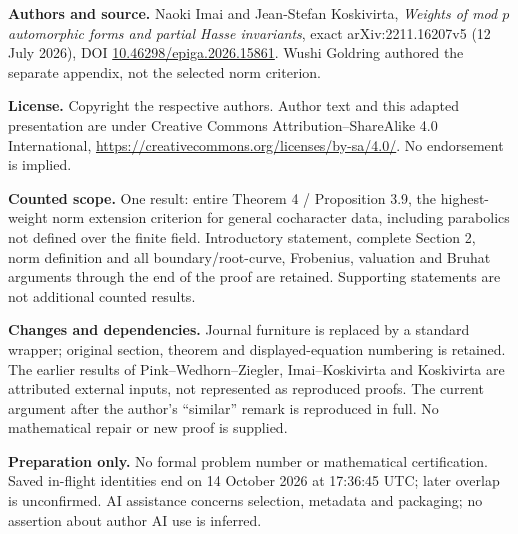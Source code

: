 \noindent\textbf{Authors and source.} Naoki Imai and Jean-Stefan Koskivirta, \emph{Weights of mod $p$ automorphic forms and partial Hasse invariants}, exact arXiv:2211.16207v5 (12 July 2026), DOI \href{https://doi.org/10.46298/epiga.2026.15861}{10.46298/epiga.2026.15861}. Wushi Goldring authored the separate appendix, not the selected norm criterion.
\par\noindent\textbf{License.} Copyright the respective authors. Author text and this adapted presentation are under Creative Commons Attribution--ShareAlike 4.0 International, \url{https://creativecommons.org/licenses/by-sa/4.0/}. No endorsement is implied.
\par\noindent\textbf{Counted scope.} One result: entire Theorem 4 / Proposition 3.9, the highest-weight norm extension criterion for general cocharacter data, including parabolics not defined over the finite field. Introductory statement, complete Section 2, norm definition and all boundary/root-curve, Frobenius, valuation and Bruhat arguments through the end of the proof are retained. Supporting statements are not additional counted results.
\par\noindent\textbf{Changes and dependencies.} Journal furniture is replaced by a standard wrapper; original section, theorem and displayed-equation numbering is retained. The earlier results of Pink--Wedhorn--Ziegler, Imai--Koskivirta and Koskivirta are attributed external inputs, not represented as reproduced proofs. The current argument after the author's ``similar'' remark is reproduced in full. No mathematical repair or new proof is supplied.
\par\noindent\textbf{Preparation only.} No formal problem number or mathematical certification. Saved in-flight identities end on 14 October 2026 at 17:36:45 UTC; later overlap is unconfirmed. AI assistance concerns selection, metadata and packaging; no assertion about author AI use is inferred.
